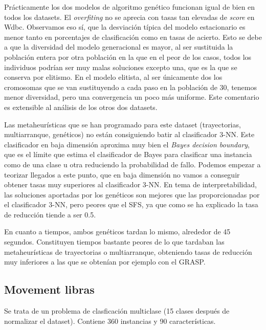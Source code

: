 \documentclass[a4paper,11pt]{article}
\newcommand{\imgn}[3]{
  \begin{minipage}{\linewidth}
    \centering
    \texttt{[image: \#1]}
    \captionof{figure}{#2}
  \end{minipage} 
}
\begin{document}
  
  Prácticamente los dos modelos de algoritmo genético funcionan igual de bien en todos los datasets. El \textit{overfiting} no
  se aprecia con tasas tan elevadas de \textit{score} en Wdbc. Observamos eso sí, que la desviación típica del modelo estacionario es
  menor tanto en porcentajes de clasificación como en tasas de acierto. Esto se debe a que la diversidad del modelo generacional
  es mayor, al ser sustituida la población entera por otra población en la que en el peor de los casos, todos los individuos
  podrían ser muy malas soluciones excepto una, que es la que se conserva por elitismo. En el modelo elitista, al ser únicamente
  dos los cromosomas que se van sustituyendo a cada paso en la población de 30, tenemos menor diversidad, pero una convergencia
  un poco más uniforme. Este comentario es extensible al análisis de los otros dos datasets.
  
  Las metaheurísticas que se han programado para este dataset (trayectorias, multiarranque, genéticos) no están consiguiendo
  batir al clasificador 3-NN. Este clasificador en baja dimensión aproxima muy bien el \textit{Bayes decision boundary}, que es
  el límite que estima el clasificador de Bayes para clasificar una instancia como de una clase u otra reduciendo la probabilidad
  de fallo. Podemos empezar a teorizar llegados a este punto, que en baja dimensión no vamos a conseguir obtener tasas muy
  superiores al clasificador 3-NN. En tema de interpretabilidad, las soluciones aportadas por los genéticos son mejores 
  que las proporcionadas por el clasificador 3-NN, pero peores que el SFS, ya que como se ha explicado la tasa de 
  reducción tiende a ser 0.5.
  
  En cuanto a tiempos, ambos genéticos tardan lo mismo, alrededor de 45 segundos. Constituyen tiempos bastante peores de 
  lo que tardaban las metaheurísticas de trayectorias o multiarranque, obteniendo tasas de reducción muy inferiores a las
  que se obtenían por ejemplo con el GRASP.
  
 
  \subsection{Movement libras}
  
  Se trata de un problema de clasficación multiclase (15 clases después de normalizar el dataset). 
  Contiene 360 instancias y 90 características.
  
\end{document}
